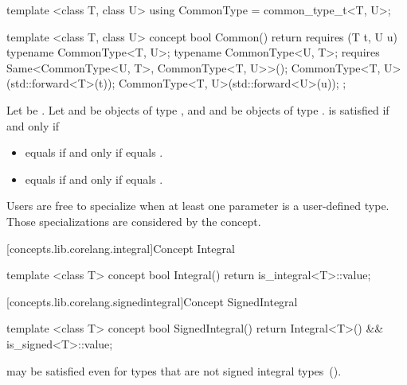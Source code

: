 \begin{addedblock}
%
\begin{itemdecl}
template <class T, class U>
using CommonType = common_type_t<T, U>;

template <class T, class U>
concept bool Common() {
  return requires (T t, U u) {
    typename CommonType<T, U>;
    typename CommonType<U, T>;
    requires Same<CommonType<U, T>, CommonType<T, U>>();
    CommonType<T, U>(std::forward<T>(t));
    CommonType<T, U>(std::forward<U>(u));
  };
}
\end{itemdecl}

\begin{itemdescr}
\pnum
Let  be . Let  and  be objects
of type , and  and  be objects of type .
 is satisfied if and only if
\begin{itemize}
\item {} equals  if and only if  equals .
\item {} equals  if and only if  equals .
\end{itemize}

\pnum
\enternote Users are free to specialize  when at least one parameter is a
user-defined type. Those specializations are considered by the  concept.\exitnote

\end{itemdescr}

[concepts.lib.corelang.integral]{Concept Integral}

%
\begin{itemdecl}
template <class T>
concept bool Integral() {
  return is_integral<T>::value;
}
\end{itemdecl}

[concepts.lib.corelang.signedintegral]{Concept SignedIntegral}

%
\begin{itemdecl}
template <class T>
concept bool SignedIntegral() {
  return Integral<T>() && is_signed<T>::value;
}
\end{itemdecl}

\begin{itemdescr}
\pnum
\enternote {} may be satisfied even for
types that are not signed integral types~().
\exitnote
\end{itemdescr}


\end{addedblock}
